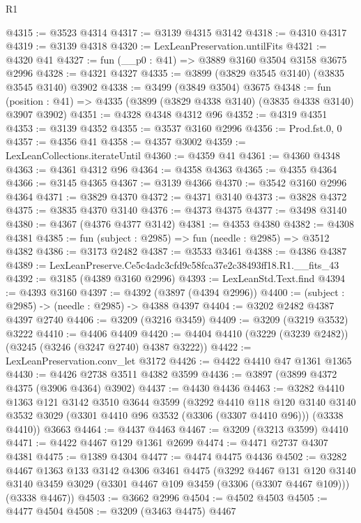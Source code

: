 \begin{lexlean}{R1}
\begin{coremodule}
@4315 := @3523 @4314
@4317 := @3139 @4315 @3142
@4318 := @4310 @4317
@4319 := @3139 @4318
@4320 := LexLeanPreservation.untilFits
@4321 := @4320 @41
@4327 := fun (__p0 : @41) => @3889 @3160 @3504 @3158 @3675 @2996
@4328 := @4321 @4327
@4335 := @3899 (@3829 @3545 @3140) (@3835 @3545 @3140) @3902
@4338 := @3499 (@3849 @3504) @3675
@4348 := fun (position : @41) => @4335 (@3899 (@3829 @4338 @3140) (@3835 @4338 @3140) @3907 @3902)
@4351 := @4328 @4348 @4312 @96
@4352 := @4319 @4351
@4353 := @3139 @4352
@4355 := @3537 @3160 @2996
@4356 := Prod.fst.{0, 0}
@4357 := @4356 @41
@4358 := @4357 @3002
@4359 := LexLeanCollections.iterateUntil
@4360 := @4359 @41
@4361 := @4360 @4348
@4363 := @4361 @4312 @96
@4364 := @4358 @4363
@4365 := @4355 @4364
@4366 := @3145 @4365
@4367 := @3139 @4366
@4370 := @3542 @3160 @2996 @4364
@4371 := @3829 @4370
@4372 := @4371 @3140
@4373 := @3828 @4372
@4375 := @3835 @4370 @3140
@4376 := @4373 @4375
@4377 := @3498 @3140
@4380 := @4367 (@4376 @4377 @3142)
@4381 := @4353 @4380
@4382 := @4308 @4381
@4385 := fun (subject : @2985) => fun (needle : @2985) => @3512 @4382
@4386 := @3173 @2482
@4387 := @3533 @3461
@4388 := @4386 @4387
@4389 := LexLeanPreserve.Ce5c4adc3cfd9c58fca37e2c38493ff18.R1.__fits_43
@4392 := @3185 (@4389 @3160 @2996)
@4393 := LexLeanStd.Text.find
@4394 := @4393 @3160
@4397 := @4392 (@3897 (@4394 @2996))
@4400 := (subject : @2985) -> (needle : @2985) -> @4388 @4397
@4404 := @3202 @2482 @4387 @4397 @2740
@4406 := @3209 (@3216 @3459)
@4409 := @3209 (@3219 @3532) @3222
@4410 := @4406 @4409
@4420 := @4404 @4410 (@3229 (@3239 @2482)) (@3245 (@3246 (@3247 @2740) @4387 @3222))
@4422 := LexLeanPreservation.conv_let @3172
@4426 := @4422 @4410 @47 @1361 @1365
@4430 := @4426 @2738 @3511 @4382 @3599
@4436 := @3897 (@3899 @4372 @4375 (@3906 @4364) @3902)
@4437 := @4430 @4436
@4463 := @3282
    @4410
    @1363
    @121
    @3142
    @3510
    @3644
    @3599
    (@3292
      @4410
      @118
      @120
      @3140
      @3140
      @3532
      @3029
      (@3301 @4410 @96 @3532 (@3306 (@3307 @4410 @96)))
      (@3338 @4410))
    @3663
@4464 := @4437 @4463
@4467 := @3209 (@3213 @3599) @4410
@4471 := @4422 @4467 @129 @1361 @2699
@4474 := @4471 @2737 @4307 @4381
@4475 := @1389 @4304
@4477 := @4474 @4475 @4436
@4502 := @3282
    @4467
    @1363
    @133
    @3142
    @4306
    @3461
    @4475
    (@3292
      @4467
      @131
      @120
      @3140
      @3140
      @3459
      @3029
      (@3301 @4467 @109 @3459 (@3306 (@3307 @4467 @109)))
      (@3338 @4467))
@4503 := @3662 @2996
@4504 := @4502 @4503
@4505 := @4477 @4504
@4508 := @3209 (@3463 @4475) @4467

\end{coremodule}
\end{lexlean}
